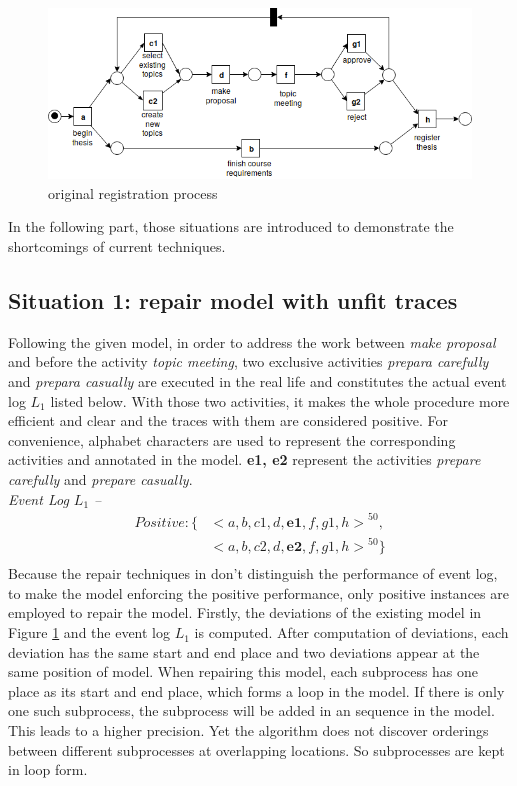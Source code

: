 \begin{figure}[h]
	\centering
	\includegraphics[width=\linewidth]{figures/introduction/Thesis-PN-Example-without-preparation.png}
	\caption{original registration process}
	\label{fig:model_a}
\end{figure}
In the following part, those situations are introduced to demonstrate the shortcomings of current techniques. 
\subsection{Situation 1: \small{repair model with unfit traces}} %
Following the given model, in order to address the work between \emph{make proposal} and before the activity \emph{topic meeting}, two exclusive activities \emph{prepara carefully} and \emph{prepara casually} are executed in the real life and constitutes the actual event log $L_1$ listed below. With those two activities, it makes the whole procedure more efficient and clear and the traces with them are considered positive. For convenience, alphabet characters are used to represent the corresponding activities and annotated in the model. \textbf{e1, e2} represent the activities \emph{prepare carefully} and \emph{prepare casually}.\\
\emph{Event Log $L_1$ -- }
		\begin{align*}
		Positive:\{ & { <a,b, c1,d,\textbf{e1},f,g1,h>}^{50}, \\   &{<a,b, c2,d,\textbf{e2},f,g1,h>}^{50} \}  \\
		\end{align*}
Because the repair techniques in \cite{fahland2015model} don't distinguish the performance of event log, to make the model enforcing the positive performance, only positive instances are employed to repair the model. Firstly, the deviations of the existing model in Figure \ref{fig:model_a} and the event log $L_1$ is computed. After computation of deviations, each deviation has the same start and end place and two deviations appear at the same position of model. When repairing this model, each subprocess has one place as its start and end place, which forms a loop in the model. If there is only one such subprocess, the subprocess will be added in an sequence in the model. This leads to a higher precision. Yet the algorithm does not discover orderings between different subprocesses at overlapping locations. So subprocesses are kept in loop form. 


